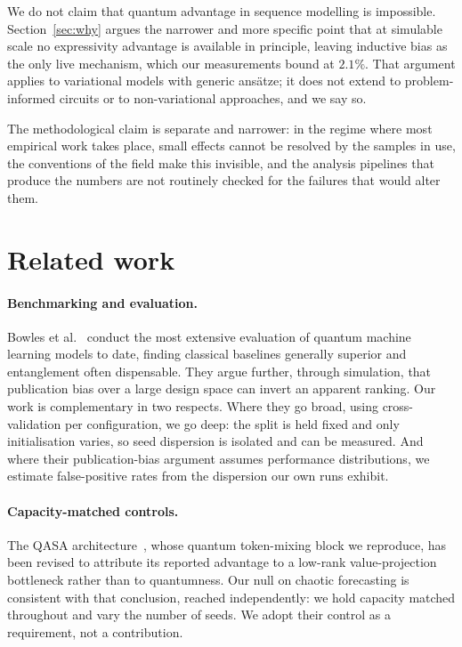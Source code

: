 \documentclass[11pt,onecolumn]{article}
\begin{document}
We do not claim that quantum advantage in sequence modelling is
impossible. Section~\ref{sec:why} argues the narrower and more specific
point that at simulable scale no expressivity advantage is available in
principle, leaving inductive bias as the only live mechanism, which our
measurements bound at $2.1\%$. That argument applies to variational
models with generic ans\"atze; it does not extend to problem-informed
circuits or to non-variational approaches, and we say so.

The methodological claim is separate and narrower: in the regime where
most empirical work takes place, small effects cannot be resolved by the
samples in use, the conventions of the field make this invisible, and
the analysis pipelines that produce the numbers are not routinely
checked for the failures that would alter them.

\section{Related work}
\paragraph{Benchmarking and evaluation.}
Bowles et al.~\cite{bowles2024} conduct the most extensive evaluation of
quantum machine learning models to date, finding classical baselines
generally superior and entanglement often dispensable. They argue
further, through simulation, that publication bias over a large design
space can invert an apparent ranking. Our work is complementary in two
respects. Where they go broad, using cross-validation per
configuration, we go deep: the split is held fixed and only
initialisation varies, so seed dispersion is isolated and can be
measured. And where their publication-bias argument assumes performance
distributions, we estimate false-positive rates from the dispersion our
own runs exhibit.

\paragraph{Capacity-matched controls.}
The QASA architecture~\cite{qasa}, whose quantum token-mixing block we
reproduce, has been revised to attribute its reported advantage to a
low-rank value-projection bottleneck rather than to quantumness. Our
null on chaotic forecasting is consistent with that conclusion, reached
independently: we hold capacity matched throughout and vary the number
of seeds. We adopt their control as a requirement, not a contribution.
\end{document}
